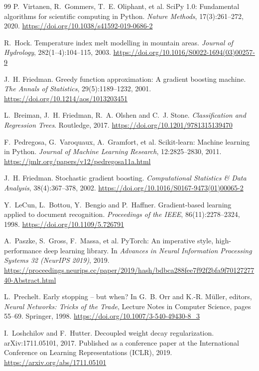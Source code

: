 \documentclass{article}
\begin{document}
\begin{thebibliography}{99}
P.~Virtanen, R.~Gommers, T.~E. Oliphant, et al. SciPy 1.0: Fundamental algorithms for scientific
computing in Python. \emph{Nature Methods}, 17(3):261--272, 2020.
\url{https://doi.org/10.1038/s41592-019-0686-2}

R.~Hock. Temperature index melt modelling in mountain areas. \emph{Journal of Hydrology},
282(1--4):104--115, 2003. \url{https://doi.org/10.1016/S0022-1694(03)00257-9}

J.~H. Friedman. Greedy function approximation: A gradient boosting machine. \emph{The Annals of
Statistics}, 29(5):1189--1232, 2001. \url{https://doi.org/10.1214/aos/1013203451}

L.~Breiman, J.~H. Friedman, R.~A. Olshen and C.~J. Stone. \emph{Classification and Regression
Trees}. Routledge, 2017. \url{https://doi.org/10.1201/9781315139470}

F.~Pedregosa, G.~Varoquaux, A.~Gramfort, et al. Scikit-learn: Machine learning in Python.
\emph{Journal of Machine Learning Research}, 12:2825--2830, 2011.
\url{https://jmlr.org/papers/v12/pedregosa11a.html}

J.~H. Friedman. Stochastic gradient boosting. \emph{Computational Statistics \& Data Analysis},
38(4):367--378, 2002. \url{https://doi.org/10.1016/S0167-9473(01)00065-2}

Y.~LeCun, L.~Bottou, Y.~Bengio and P.~Haffner. Gradient-based learning applied to document
recognition. \emph{Proceedings of the IEEE}, 86(11):2278--2324, 1998.
\url{https://doi.org/10.1109/5.726791}

A.~Paszke, S.~Gross, F.~Massa, et al. PyTorch: An imperative style, high-performance deep
learning library. In \emph{Advances in Neural Information Processing Systems 32 (NeurIPS 2019)},
2019.
\url{https://proceedings.neurips.cc/paper/2019/hash/bdbca288fee7f92f2bfa9f7012727740-Abstract.html}

L.~Prechelt. Early stopping -- but when? In G.~B. Orr and K.-R. M\"uller, editors, \emph{Neural
Networks: Tricks of the Trade}, Lecture Notes in Computer Science, pages 55--69. Springer, 1998.
\url{https://doi.org/10.1007/3-540-49430-8_3}

I.~Loshchilov and F.~Hutter. Decoupled weight decay regularization. arXiv:1711.05101, 2017.
Published as a conference paper at the International Conference on Learning Representations
(ICLR), 2019. \url{https://arxiv.org/abs/1711.05101}


\end{thebibliography}
\end{document}
